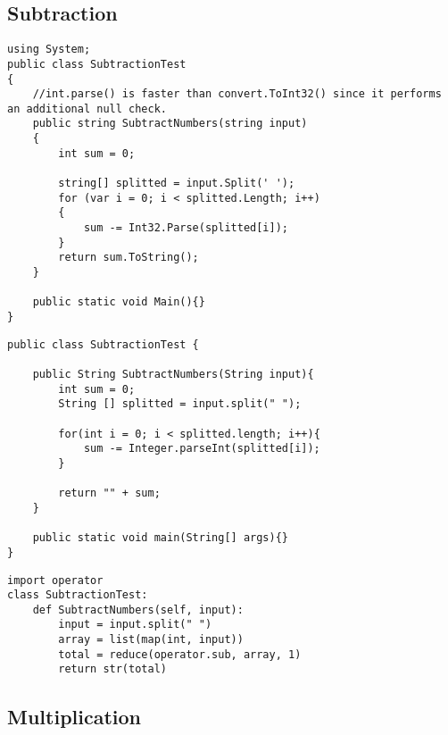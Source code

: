 \subsection{Subtraction}


	\lstset{style=sharpc}
	\begin{lstlisting}
using System;
public class SubtractionTest
{
    //int.parse() is faster than convert.ToInt32() since it performs an additional null check.
    public string SubtractNumbers(string input)
    {
        int sum = 0;

        string[] splitted = input.Split(' ');
        for (var i = 0; i < splitted.Length; i++)
        {
            sum -= Int32.Parse(splitted[i]);
        }
        return sum.ToString();
    }
	
	public static void Main(){}
}
	\end{lstlisting}

	\lstset{style=java}
	\begin{lstlisting}
public class SubtractionTest {
	
	public String SubtractNumbers(String input){
		int sum = 0;
		String [] splitted = input.split(" ");
		
		for(int i = 0; i < splitted.length; i++){
			sum -= Integer.parseInt(splitted[i]);
		}
		
		return "" + sum;
	}
	
	public static void main(String[] args){}
}
	\end{lstlisting}


	\lstset{style=python}
	\begin{lstlisting}
import operator
class SubtractionTest:
    def SubtractNumbers(self, input):
        input = input.split(" ")
        array = list(map(int, input))
        total = reduce(operator.sub, array, 1)
        return str(total)
	\end{lstlisting}


\subsection{Multiplication}



